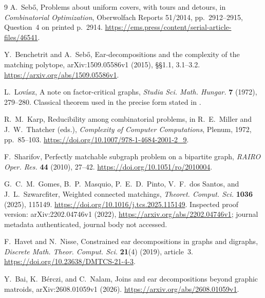 \documentclass[11pt]{article}
\begin{document}
\begin{thebibliography}{9}
A.~Seb\H{o}, Problems about uniform covers, with tours and detours,
in \emph{Combinatorial Optimization}, Oberwolfach Reports 51/2014,
pp.~2912--2915, Question~4 on printed p.~2914.
\url{https://ems.press/content/serial-article-files/46541}.

Y.~Benchetrit and A.~Seb\H{o},
Ear-decompositions and the complexity of the matching polytope,
arXiv:1509.05586v1 (2015), \S\S1.1, 3.1--3.2.
\url{https://arxiv.org/abs/1509.05586v1}.

L.~Lov\'asz, A note on factor-critical graphs,
\emph{Studia Sci. Math. Hungar.} \textbf{7} (1972), 279--280.
Classical theorem used in the precise form stated in \cite[Theorem~3.2]{BS}.

R.~M.~Karp, Reducibility among combinatorial problems,
in R.~E.~Miller and J.~W.~Thatcher (eds.),
\emph{Complexity of Computer Computations}, Plenum, 1972, pp.~85--103.
\url{https://doi.org/10.1007/978-1-4684-2001-2_9}.

F.~Sharifov, Perfectly matchable subgraph problem on a bipartite graph,
\emph{RAIRO Oper. Res.} \textbf{44} (2010), 27--42.
\url{https://doi.org/10.1051/ro/2010004}.

G.~C.~M.~Gomes, B.~P.~Masquio, P.~E.~D.~Pinto,
V.~F.~dos Santos, and J.~L.~Szwarcfiter,
Weighted connected matchings, \emph{Theoret. Comput. Sci.}
\textbf{1036} (2025), 115149.
\url{https://doi.org/10.1016/j.tcs.2025.115149}.
Inspected proof version: arXiv:2202.04746v1 (2022),
\url{https://arxiv.org/abs/2202.04746v1}; journal metadata authenticated,
journal body not accessed.

F.~Havet and N.~Nisse, Constrained ear decompositions in graphs and
digraphs, \emph{Discrete Math. Theor. Comput. Sci.}
\textbf{21}(4) (2019), article~3.
\url{https://doi.org/10.23638/DMTCS-21-4-3}.

Y.~Bai, K.~B\'erczi, and C.~Nalam,
Joins and ear decompositions beyond graphic matroids,
arXiv:2608.01059v1 (2026).
\url{https://arxiv.org/abs/2608.01059v1}.
\end{thebibliography}
\end{document}
